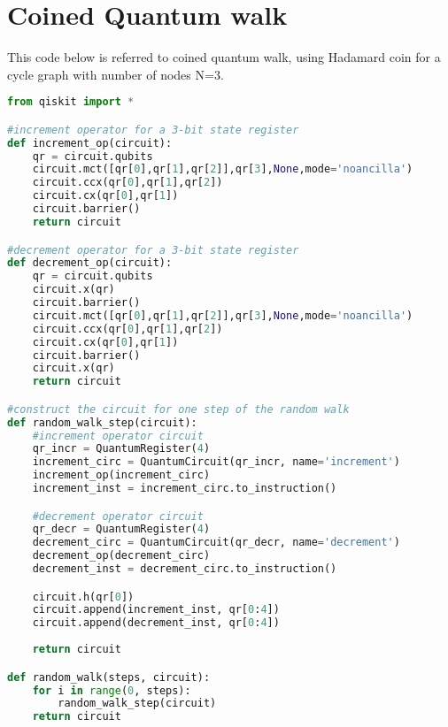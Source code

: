 \section{Coined Quantum walk}
This code below is referred to coined quantum walk, using Hadamard coin for a
cycle graph with number of nodes N=3.
\enlargethispage{\baselineskip}

\begin{lstlisting}[breaklines,language=Python]
from qiskit import *

#increment operator for a 3-bit state register
def increment_op(circuit):
    qr = circuit.qubits
    circuit.mct([qr[0],qr[1],qr[2]],qr[3],None,mode='noancilla')
    circuit.ccx(qr[0],qr[1],qr[2])
    circuit.cx(qr[0],qr[1])
    circuit.barrier()
    return circuit

#decrement operator for a 3-bit state register
def decrement_op(circuit):
    qr = circuit.qubits
    circuit.x(qr)   
    circuit.barrier()
    circuit.mct([qr[0],qr[1],qr[2]],qr[3],None,mode='noancilla')
    circuit.ccx(qr[0],qr[1],qr[2])
    circuit.cx(qr[0],qr[1])
    circuit.barrier()
    circuit.x(qr)
    return circuit

#construct the circuit for one step of the random walk
def random_walk_step(circuit):
    #increment operator circuit
    qr_incr = QuantumRegister(4)
    increment_circ = QuantumCircuit(qr_incr, name='increment')
    increment_op(increment_circ)
    increment_inst = increment_circ.to_instruction()

    #decrement operator circuit
    qr_decr = QuantumRegister(4)
    decrement_circ = QuantumCircuit(qr_decr, name='decrement')
    decrement_op(decrement_circ)
    decrement_inst = decrement_circ.to_instruction()

    circuit.h(qr[0])
    circuit.append(increment_inst, qr[0:4])
    circuit.append(decrement_inst, qr[0:4])
    
    return circuit   

def random_walk(steps, circuit):
    for i in range(0, steps):
        random_walk_step(circuit)
    return circuit  

\end{lstlisting}
%
